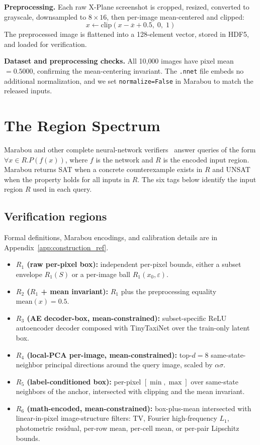 \documentclass[twocolumn,smallextended,runningheads]{svjour3}
\begin{document}
\textbf{Preprocessing.} Each raw X-Plane screenshot is cropped, resized, converted to grayscale, downsampled to $8 \times 16$, then per-image mean-centered and clipped:
\begin{equation}
x \leftarrow \text{clip}\!\left(x - \overline{x} + 0.5,\; 0,\; 1\right)
\end{equation}
The preprocessed image is flattened into a 128-element vector, stored in HDF5, and loaded for verification.

\textbf{Dataset and preprocessing checks.} All 10{,}000 images have pixel mean $= 0.5000$, confirming the mean-centering invariant. The \texttt{.nnet} file embeds no additional normalization, and we set \texttt{normalize=False} in Marabou to match the released inputs.

\section{The Region Spectrum}
\label{sec:spectrum}

Marabou and other complete neural-network verifiers~\cite{wu2024marabou,katz2017reluplex,katz2019marabou} answer queries of the form $\forall x \in R . P(f(x))$, where $f$ is the network and $R$ is the encoded input region. Marabou returns SAT when a concrete counterexample exists in $R$ and UNSAT when the property holds for all inputs in $R$. The six tags below identify the input region $R$ used in each query.

\subsection{Verification regions}
\label{sec:claim_scope}

Formal definitions, Marabou encodings, and calibration details are in Appendix~\ref{app:construction_ref}.

\begin{itemize}[nosep]
  \item \textbf{$R_1$ (raw per-pixel box):} independent per-pixel bounds, either a subset envelope $R_1(S)$ or a per-image ball $R_1(x_0,\varepsilon)$.
  \item \textbf{$R_2$ ($R_1$ + mean invariant):} $R_1$ plus the preprocessing equality $\mathrm{mean}(x){=}0.5$.
  \item \textbf{$R_3$ (AE decoder-box, mean-constrained):} subset-specific ReLU autoencoder decoder composed with TinyTaxiNet over the train-only latent box.
  \item \textbf{$R_4$ (local-PCA per-image, mean-constrained):} top-$d{=}8$ same-state-neighbor principal directions around the query image, scaled by $\alpha\sigma$.
  \item \textbf{$R_5$ (label-conditioned box):} per-pixel $[\min,\max]$ over same-state neighbors of the anchor, intersected with clipping and the mean invariant.
  \item \textbf{$R_6$ (math-encoded, mean-constrained):} box-plus-mean intersected with linear-in-pixel image-structure filters: TV, Fourier high-frequency $L_1$, photometric residual, per-row mean, per-cell mean, or per-pair Lipschitz bounds.
\end{itemize}
\end{document}
